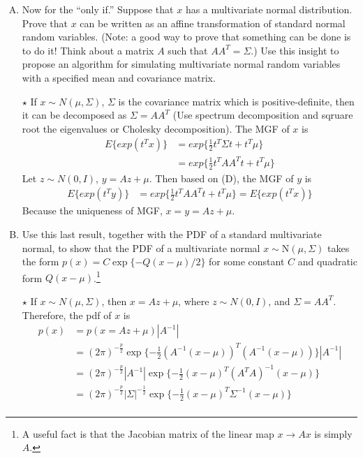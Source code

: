 \documentclass[11pt]{article}
\newcommand{\jie}{$\star$ }
\newcommand{\half}{\frac{1}{2}}
\newcommand{\N}{\mbox{N}}
\begin{document}
\begin{enumerate}[(A)]
\bigskip

\item Now for the ``only if.''  Suppose that $x$ has a multivariate normal distribution.  Prove that $x$ can be written as an affine transformation of standard normal random variables.  (Note: a good way to prove that something can be done is to do it!  Think about a matrix $A$ such that $A A^T = \Sigma$.)  Use this insight to propose an algorithm for simulating multivariate normal random variables with a specified mean and covariance matrix.

\bigskip

\jie
If $x \sim N(\mu,\Sigma)$, $\Sigma$ is the covariance matrix which is positive-definite, then it can be decomposed as $\Sigma = AA^T$ (Use spectrum decomposition and sqruare root the eigenvalues or Cholesky decomposition). The MGF of $x$ is
\begin{align*}
	E\{ exp(t^T x) \} &= exp\{ \half t^T \Sigma t+t^T\mu \} \\
	&= exp\{ \half t^T AA^T t+t^T\mu \} 
\end{align*}
Let $z \sim N(0,I)$, $y = Az+\mu$. Then based on (D), the MGF of $y$ is 
\begin{align*}
	E\{ exp(t^T y) \} &= exp\{ \half t^T AA^T t+t^T\mu \} = E\{ exp(t^T x) \}
\end{align*}
Because the uniqueness of MGF, $x=y= Az+\mu$.

\bigskip

\item Use this last result, together with the PDF of a standard multivariate normal, to show that the PDF of a multivariate normal $x \sim \N(\mu, \Sigma)$ takes the form $p(x) = C \exp\{-Q(x-\mu)/2\}$ for some constant $C$ and quadratic form $Q(x-\mu)$.\footnote{A useful fact is that the Jacobian matrix of the linear map $x \rightarrow Ax$ is simply $A$.}

\bigskip

\jie
If $x \sim N(\mu, \Sigma)$, then $x = A z + \mu$, where $z \sim N(0, I)$, and $\Sigma =  AA^T$.
Therefore, the pdf of $x$ is
\begin{align*}
    p(x) &= p(x= A z + \mu) |A^{-1}| \\
    &= (2\pi)^{-\frac{p}{2}} \exp \{ -\half (A^{-1}(x-\mu))^T(A^{-1}(x-\mu)) \} |A^{-1}| \\
    &= (2\pi)^{-\frac{p}{2}} |A^{-1}| \exp \{ -\half (x-\mu)^T (A^TA)^{-1} (x-\mu) \}  \\
    &= (2\pi)^{-\frac{p}{2}} |\Sigma|^{-\half} \exp \{ -\half (x-\mu)^T \Sigma^{-1} (x-\mu) \}  \\
\end{align*}


\end{enumerate}
\end{document}
